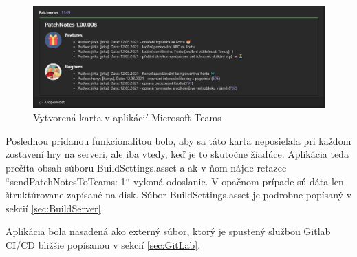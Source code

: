 \documentclass[slovak, bachelorpractice]{diploma}
\begin{document}
\begin{figure}[!htbp]
	\centering
	\includegraphics[width=1\textwidth]{Pictures/gitlogger.png}
	\caption{Vytvorená karta v aplikácií Microsoft Teams}
	\label{pic:Logger}
\end{figure}

Poslednou pridanou funkcionalitou bolo, aby sa táto karta neposielala pri každom zostavení hry na serveri, ale iba vtedy, keď je to skutočne žiadúce. Aplikácia teda prečíta obsah súboru BuildSettings.asset a ak v ňom nájde reťazec ``sendPatchNotesToTeams: 1`` vykoná odoslanie. V opačnom prípade sú dáta len štruktúrovane zapísané na disk. Súbor BuildSettings.asset je podrobne popísaný v sekcií \ref{sec:BuildServer}.

Aplikácia bola nasadená ako externý súbor, ktorý je spustený službou Gitlab CI/CD bližšie popísanou v sekcií \ref{sec:GitLab}.
\end{document}
